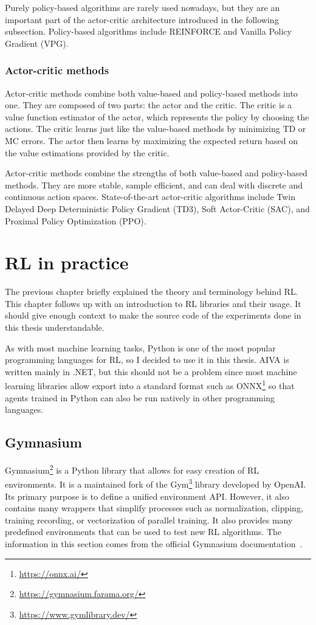 \documentclass[
  digital,     %
  oneside,     %
  nosansbold,  %
  nocolorbold, %
  lof,         %
  lot,         %
]{fithesis4}
\begin{document}
Purely policy-based algorithms are rarely used nowadays, but they are an important part of the actor-critic architecture introduced in the following subsection. Policy-based algorithms include REINFORCE and Vanilla Policy Gradient (VPG).

\subsection{Actor-critic methods}

Actor-critic methods combine both value-based and policy-based methods into one. They are composed of two parts: the actor and the critic. The critic is a value function estimator of the actor, which represents the policy by choosing the actions. The critic learns just like the value-based methods by minimizing TD or MC errors. The actor then learns by maximizing the expected return based on the value estimations provided by the critic.

Actor-critic methods combine the strengths of both value-based and policy-based methods. They are more stable, sample efficient, and can deal with discrete and continuous action spaces. State-of-the-art actor-critic algorithms include Twin Delayed Deep Deterministic Policy Gradient (TD3), Soft Actor-Critic (SAC), and Proximal Policy Optimization (PPO).

\chapter{RL in practice}

The previous chapter briefly explained the theory and terminology behind RL. This chapter follows up with an introduction to RL libraries and their usage. It should give enough context to make the source code of the experiments done in this thesis understandable.

As with most machine learning tasks, Python is one of the most popular programming languages for RL, so I decided to use it in this thesis. AIVA is written mainly in .NET, but this should not be a problem since most machine learning libraries allow export into a standard format such as ONNX\footnote{\url{https://onnx.ai/}} so that agents trained in Python can also be run natively in other programming languages.

\section{Gymnasium}
\label{sec:gym}
Gymnasium\footnote{\url{https://gymnasium.farama.org/}} is a Python library that allows for easy creation of RL environments. It is a maintained fork of the Gym\footnote{\url{https://www.gymlibrary.dev/}} library developed by OpenAI. Its primary purpose is to define a unified environment API. However, it also contains many wrappers that simplify processes such as normalization, clipping, training recording, or vectorization of parallel training. It also provides many predefined environments that can be used to test new RL algorithms. The information in this section comes from the official Gymnasium documentation~\cite{gym-docs}.
\end{document}
